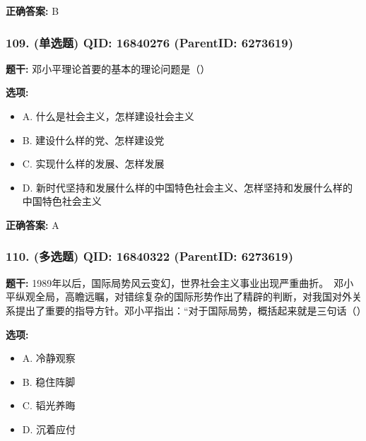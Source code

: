 \documentclass[12pt,UTF8]{ctexart}
\begin{document}
\textbf{正确答案:}
B

\vspace{0.3em}\hrulefill\vspace{0.7em}

\subsubsection*{109. (单选题) \small QID: 16840276 (ParentID: 6273619)}

\textbf{题干:}
邓小平理论首要的基本的理论问题是（）



\textbf{选项:}
\begin{itemize}[leftmargin=*]

  \item A. 什么是社会主义，怎样建设社会主义

  \item B. 建设什么样的党、怎样建设党

  \item C. 实现什么样的发展、怎样发展

  \item D. 新时代坚持和发展什么样的中国特色社会主义、怎样坚持和发展什么样的中国特色社会主义

\end{itemize}

\textbf{正确答案:}
A

\vspace{0.3em}\hrulefill\vspace{0.7em}

\subsubsection*{110. (多选题) \small QID: 16840322 (ParentID: 6273619)}

\textbf{题干:}
1989年以后，国际局势风云变幻，世界社会主义事业出现严重曲折。　邓小平纵观全局，高瞻远瞩，对错综复杂的国际形势作出了精辟的判断，对我国对外关系提出了重要的指导方针。邓小平指出：“对于国际局势，概括起来就是三句话（）



\textbf{选项:}
\begin{itemize}[leftmargin=*]

  \item A. 冷静观察

  \item B. 稳住阵脚

  \item C. 韬光养晦

  \item D. 沉着应付

\end{itemize}
\end{document}
